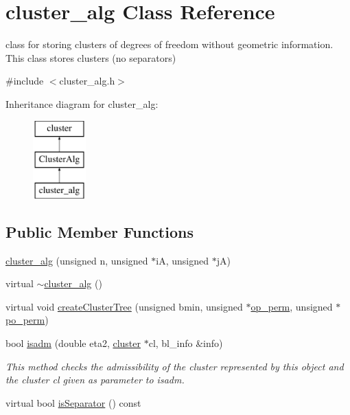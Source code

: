 \hypertarget{classcluster__alg}{
\section{cluster\-\_\-alg \-Class \-Reference}
\label{classcluster__alg}
}


class for storing clusters of degrees of freedom without geometric information. \-This class stores clusters (no separators)  




{\ttfamily \#include $<$cluster\-\_\-alg.\-h$>$}

\-Inheritance diagram for cluster\-\_\-alg\-:\begin{figure}[H]
\begin{center}
\leavevmode
\includegraphics[height=3.000000cm]{classcluster__alg}
\end{center}
\end{figure}
\subsection*{\-Public \-Member \-Functions}
\begin{DoxyCompactItemize}
\item 
\hyperlink{classcluster__alg_a7b80a55ab14ddfd8a6c9f67953768240}{cluster\-\_\-alg} (unsigned n, unsigned $\ast$i\-A, unsigned $\ast$j\-A)
\item 
virtual \hyperlink{classcluster__alg_a2f0e2dfe7df931fc2a7161e19b77622b}{$\sim$cluster\-\_\-alg} ()
\item 
virtual void \hyperlink{classcluster__alg_a2464aa83e8604d2098870c461f93b013}{create\-Cluster\-Tree} (unsigned bmin, unsigned $\ast$\hyperlink{classClusterAlg_a4f06e1465978072d8c6bd098e062b701}{op\-\_\-perm}, unsigned $\ast$\hyperlink{classClusterAlg_af3d1d7c4ae0516ff9de725d3ff760b07}{po\-\_\-perm})
\item 
bool \hyperlink{classcluster__alg_ae3c32452aca9733c237f0c23dc8f95e6}{isadm} (double eta2, \hyperlink{classcluster}{cluster} $\ast$cl, bl\-\_\-info \&info)
\begin{DoxyCompactList}\small\item\em \-This method checks the admissibility of the cluster represented by this object and the cluster cl given as parameter to isadm. \end{DoxyCompactList}\item 
virtual bool \hyperlink{classcluster__alg_a20b9fac849beaf8b760e3bb15fae66e0}{is\-Separator} () const 
\end{DoxyCompactItemize}
